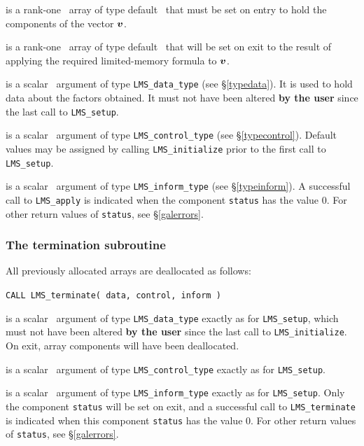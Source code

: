 \documentclass{galahad}
\newcommand{\packagename}{LMS}
\begin{document}
\vspace*{-3mm}
\begin{description}
 is a rank-one  \intentin\ array of type default \real\
that must be set on entry to hold the components of the vector ${\bm{v}}$.

 is a rank-one  \intentout\ array of type default \real\
that will be set on exit to the result of applying the required
 limited-memory formula to ${\bm{v}}$.

 is a scalar \intentinout\ argument of type
{\tt \packagename\_data\_type}
(see \S\ref{typedata}). It is used to hold data about the factors obtained.
It must not have been altered {\bf by the user} since the last call to
{\tt \packagename\_setup}.

 is a scalar \intentin\ argument of type
{\tt \packagename\_control\_type}
(see \S\ref{typecontrol}). Default values may be assigned by calling
{\tt \packagename\_initialize} prior to the first call to
{\tt \packagename\_setup}.

 is a scalar \intentout\ argument of type
{\tt \packagename\_inform\_type}
(see \S\ref{typeinform}). A successful call to {\tt \packagename\_apply}
is indicated when the  component {\tt status} has the value 0.
For other return values of {\tt status}, see \S\ref{galerrors}.

\end{description}


\subsubsection{The  termination subroutine}
All previously allocated arrays are deallocated as follows:
\vspace*{1mm}

\hspace{8mm}
{\tt CALL \packagename\_terminate( data, control, inform )}

\begin{description}

 is a scalar \intentinout\ argument of type
{\tt \packagename\_data\_type}
exactly as for
{\tt \packagename\_setup},
which must not have been altered {\bf by the user} since the last call to
{\tt \packagename\_initialize}.
On exit, array components will have been deallocated.

 is a scalar \intentin\ argument of type
{\tt \packagename\_control\_type}
exactly as for
{\tt \packagename\_setup}.

 is a scalar \intentout\ argument of type
{\tt \packagename\_inform\_type}
exactly as for
{\tt \packagename\_setup}.
Only the component {\tt status} will be set on exit, and a
successful call to
{\tt \packagename\_terminate}
is indicated when this  component {\tt status} has the value 0.
For other return values of {\tt status}, see \S\ref{galerrors}.

\end{description}
\end{document}
